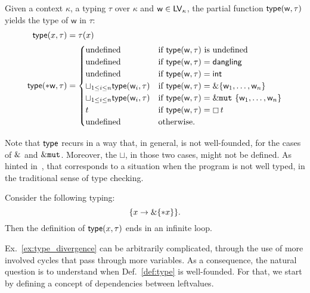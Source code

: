 \begin{definition}\label{def:type}
  Given a context $\kappa$, a typing $\tau$ over $\kappa$
  and $\mathsf{w}\in\mathsf{LV}_\kappa$, the partial function
  $\mathsf{type}(\mathsf{w},\tau)$ yields the type of $\mathsf{w}$ in $\tau$:
  \begin{align*}
    \mathsf{type}(x,\tau)&=\tau(x)\\
    \mathsf{type}(*\mathsf{w},\tau)&=\begin{cases}
    \text{undefined} & \text{if $\mathsf{type}(\mathsf{w},\tau)$ is undefined}\\
    \text{undefined} & \text{if $\mathsf{type}(\mathsf{w},\tau)=\mathsf{dangling}$}\\
    \text{undefined} & \text{if $\mathsf{type}(\mathsf{w},\tau)=\mathsf{int}$}\\
    \sqcup_{1\le i\le n}\mathsf{type}(\mathsf{w}_i,\tau) & \text{if $\mathsf{type}(\mathsf{w},\tau)=\&\{\mathsf{w}_1,\ldots,\mathsf{w}_n\}$}\\
    \sqcup_{1\le i\le n}\mathsf{type}(\mathsf{w}_i,\tau) & \text{if $\mathsf{type}(\mathsf{w},\tau)=\&\mathtt{mut}\ \{\mathsf{w}_1,\ldots,\mathsf{w}_n\}$}\\
    t & \text{if $\mathsf{type}(\mathsf{w},\tau)=\boxempty\,{t}$}\\
    \text{undefined} & \text{otherwise.}
    \end{cases}
  \end{align*}
\end{definition}

\noindent
Note that $\mathsf{type}$ recurs in a way that, in general,
is not well-founded, for the cases of $\&$ and $\&\mathtt{mut}$.
Moreover, the $\sqcup$, in those two cases, might not be defined.
As hinted in~\cite{Pearce21}, that corresponds to a situation when the program
is not well typed, in the traditional sense of type checking.

\begin{example}\label{ex:type_divergence}
  Consider the following typing:
  \[
  \{x\to\&\{\mathtt{*}x\}\}.
  \]
  Then the definition of $\mathsf{type}(x,\tau)$ ends in an infinite loop.
\end{example}

\noindent
Ex.~\ref{ex:type_divergence} can be arbitrarily complicated, through the
use of more involved cycles that pass through more variables. As a consequence,
the natural question is to understand when Def.~\ref{def:type} is well-founded.
For that, we start by defining a concept of dependencies between leftvalues.

